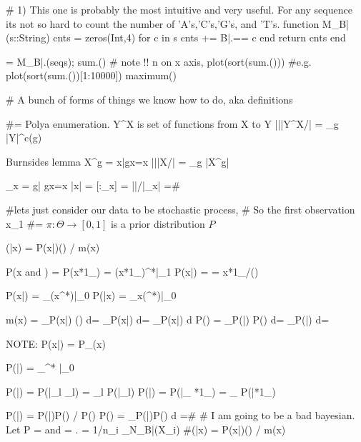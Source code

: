 # 1) This one is probably the most intuitive and very useful. For any sequence its not so hard to count the number of 'A's,'C's,'G's, and 'T's.
function M_B\bar(s::String)
	cnts = zeros(Int,4)
	for c in s
		cnts += B\bar .== c
	end
	return cnts
end

 = M_B\bar.(seqs);
sum.()
# note !! n on x axis,
plot(sort(sum.()))
#e.g. plot(sort(sum.())[1:10000])
maximum()

# A bunch of forms of things we know how to do, aka definitions 

#=
Polya enumeration.
Y^X is set of functions from X to Y
|||Y^X/| = \sum_{g\in{}} |Y|^{c(g)}

Burnsides lemma
X^g = {x\inX|gx=x}
|||X/| = \sum_{g\in{}} |X^g|

_x = {g\in{}| gx=x}
|x| = [:_x] = ||/|_x| 
=#


#lets just consider our data to be stochastic process,
# So the first observation x\_1
#=
$\pi:\Theta\to[0,1]$ is a prior distribution
$P$

\pi(\theta|x) = P(x|\theta)\pi(\theta) / m(x)

P(x and \theta) = P(x*1_{\theta}) = (x*1_{\theta})^*|_1
P(x|\theta) =  = x*1_{\theta}/\pi(\theta)

P(x|\theta) = \partial_\theta(x^*)|_0
P(\theta|x) = \partial_x(\theta^*)|_0

m(x) = \int_\Theta P(x|\theta) \pi(\theta) d\theta = \int_\Theta P(x|\theta) d\pi = \int_\Theta P(x|\theta) d\pi
P(\theta) = \int_\Omega P(\theta|\omega) P(\omega) d\omega = \int_\Omega P(\theta|\omega) d\omega =

NOTE: P(x|\theta) = P_\theta(x)

P(|\theta) = \partial_\theta  {}^* |_0


P(\theta|) = P(\theta|\bigoplus_{l\in{}} _l) = \bigoplus_l P(\theta|_l)
P(\theta|) = P(\theta|\bigoplus_{\theta\in\Theta} *1_{\theta}) = \bigoplus_{\theta\in\Theta} P(\theta|*1_{\theta})


P(\theta|) = P(|\theta)P(\theta) / P()
P() = \int_\Theta P(|\theta)P(\theta) d\theta
=#
# I am going to be a bad bayesian. Let P =  and \pi = .  = 1/n\sum_i \delta_{N_B\bar(X_i)}
#(\theta|x) = P(x|\theta)\pi(\theta) / m(x)


